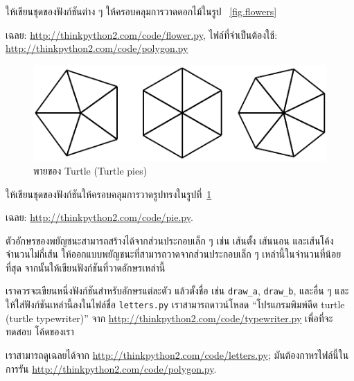 \begin{exercise}

ให้เขียนชุดของฟังก์ชันต่าง ๆ ให้ครอบคลุมการวาดดอกไม้ในรูป ~\ref{fig.flowers}

เฉลย: \url{http://thinkpython2.com/code/flower.py},
ไฟล์ที่จำเป็นต้องใช้: \url{http://thinkpython2.com/code/polygon.py}

\end{exercise}

\begin{figure}
\centerline
{\includegraphics[scale=0.8]{figs/pies.pdf}}
\caption{พายของ Turtle (Turtle pies)}
\label{fig.pies}
\end{figure}


\begin{exercise}

ให้เขียนชุดของฟังก์ชันให้ครอบคลุมการวาดรูปทรงในรูปที่~\ref{fig.pies}

เฉลย: \url{http://thinkpython2.com/code/pie.py}.

\end{exercise}

\begin{exercise}

ตัวอักษรของพยัญชนะสามารถสร้างได้จากส่วนประกอบเล็ก ๆ เช่น เส้นตั้ง เส้นนอน และเส้นโค้งจำนวนไม่กี่เส้น
ให้ออกแบบพยัญชนะที่สามารถวาดจากส่วนประกอบเล็ก ๆ เหล่านี้ในจำนวนที่น้อยที่สุด
จากนั้นให้เขียนฟังก์ชันที่วาดอักษรเหล่านี้

เราควรจะเขียนหนึ่งฟังก์ชันสำหรับอักษรแต่ละตัว แล้วตั้งชื่อ เช่น \verb"draw_a", \verb"draw_b", และอื่น ๆ
และให้ใส่ฟังก์ชันเหล่านี้ลงในไฟล์ชื่อ {\tt letters.py} เราสามารถดาวน์โหลด ``โปรแกรมพิมพ์ดีด turtle 
(turtle typewriter)''  จาก \url{http://thinkpython2.com/code/typewriter.py} เพื่อที่จะทดสอบ
โค้ดของเรา

เราสามารถดูเฉลยได้จาก \url{http://thinkpython2.com/code/letters.py};
มันต้องกาหรไฟล์นี้ในการรัน
\url{http://thinkpython2.com/code/polygon.py}.

\end{exercise}

